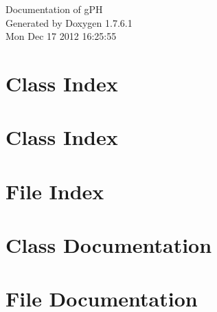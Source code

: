 \documentclass[a4paper]{book}
\begin{document}
\hypersetup{pageanchor=false,citecolor=blue}
\begin{titlepage}
\vspace*{7cm}
\begin{center}
{\Large \-Documentation of g\-P\-H }\\
\vspace*{1cm}
{\large \-Generated by Doxygen 1.7.6.1}\\
\vspace*{0.5cm}
{\small Mon Dec 17 2012 16:25:55}\\
\end{center}
\end{titlepage}
\clearemptydoublepage
{}
\tableofcontents
\clearemptydoublepage
{}
\hypersetup{pageanchor=true,citecolor=blue}
\chapter{\-Class \-Index}

\chapter{\-Class \-Index}

\chapter{\-File \-Index}

\chapter{\-Class \-Documentation}

































\chapter{\-File \-Documentation}


















\printindex
\end{document}
